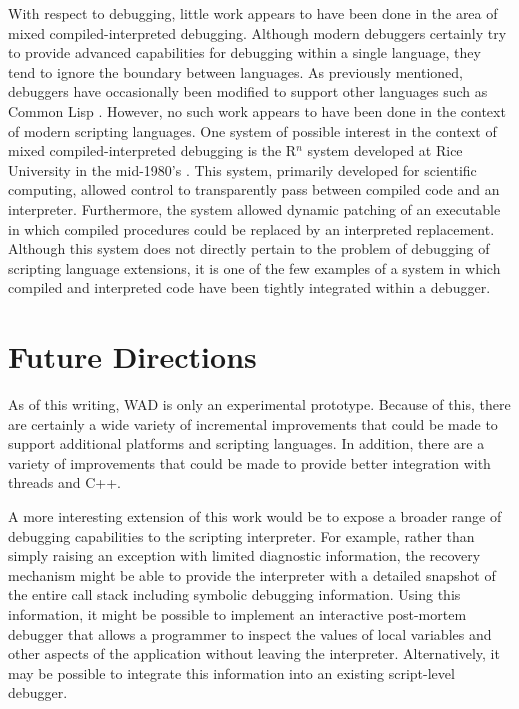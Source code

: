 With respect to debugging, little work appears to have been done in the area of
mixed compiled-interpreted debugging.   Although modern debuggers
certainly try to provide advanced capabilities for debugging within a
single language, they tend to ignore the boundary between languages.
As previously mentioned, debuggers have occasionally been modified to
support other languages such as Common Lisp \cite{wcl}.  However, no such work appears
to have been done in the context of modern scripting languages.  One system of possible interest
in the context of mixed compiled-interpreted debugging is the R$^{n}$
system developed at Rice University in the mid-1980's \cite{carle}.  This
system, primarily developed for scientific computing, allowed control
to transparently pass between compiled code and an interpreter.
Furthermore, the system allowed dynamic patching of an executable in
which compiled procedures could be replaced by an interpreted
replacement.  Although this system does not directly pertain to the problem of 
debugging of scripting language extensions, it is one of the few
examples of a system in which compiled and interpreted code have been
tightly integrated within a debugger.

\section{Future Directions}

As of this writing, WAD is only an experimental prototype.  Because of
this, there are certainly a wide variety of incremental improvements
that could be made to support additional platforms and scripting
languages. In addition, there are a variety of improvements that could be made
to provide better integration with threads and C++.

A more interesting extension of this work would be to expose a broader
range of debugging capabilities to the scripting interpreter.  For example,
rather than simply raising an exception with limited diagnostic
information, the recovery mechanism might be able to provide the
interpreter with a detailed snapshot of the entire call stack
including symbolic debugging information.  Using this information, it
might be possible to implement an interactive post-mortem debugger
that allows a programmer to inspect the values of local
variables and other aspects of the application without leaving the
interpreter.  Alternatively, it may be possible to integrate this information
into an existing script-level debugger. 

